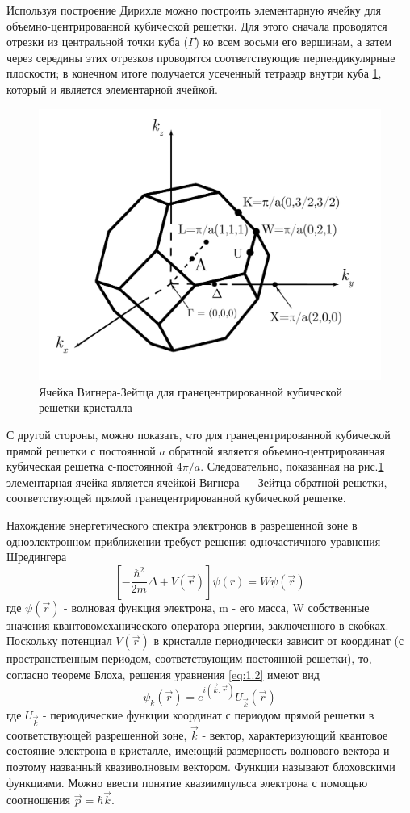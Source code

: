 		Используя построение Дирихле можно построить элементарную ячейку для объемно-центрированной кубической решетки. Для
		этого сначала проводятся отрезки из центральной точки куба ($\Gamma$) ко всем восьми его вершинам, а затем через середины этих
		отрезков проводятся соответствующие перпендикулярные плоскости; в конечном итоге получается усеченный тетраэдр внутри
		куба \ref{fig:1.4}, который и является элементарной ячейкой.
		\begin{figure}[h!]
			\centering
			\includegraphics[width = .8\linewidth]{img/14}
			\caption{Ячейка Вигнера-Зейтца для гранецентрированной кубической решетки кристалла}
			\label{fig:1.4}
		\end{figure}
		С другой стороны, можно показать, что для гранецентрированной кубической прямой решетки с постоянной $a$ обратной является
		объемно-центрированная кубическая решетка с-постоянной $4 \pi /a$. Следовательно, показанная на рис.\ref{fig:1.4} элементарная ячейка
		является ячейкой Вигнера — Зейтца обратной решетки, соответствующей прямой гранецентрированной кубической решетке.
		
		Нахождение энергетического спектра электронов в разрешенной зоне в одноэлектронном приближении требует решения одночастичного уравнения Шредингера
		\begin{equation}
		\left[-\frac{\hbar^{2}}{2 m} \Delta+V(\vec{r})\right] \psi(r)=W \psi(\vec{r})
		\label{eq:1.4}
		\end{equation}
		где $\psi(\vec{r})$ - волновая функция электрона, m - его масса, W собственные значения квантовомеханического оператора
		энергии, заключенного в скобках. Поскольку потенциал $V(\vec{r})$ в кристалле периодически зависит от координат (с
		пространственным периодом, соответствующим постоянной решетки), то, согласно теореме Блоха, решения уравнения
		\eqref{eq:1.2} имеют вид
		\begin{equation}
		\psi_{k}(\vec{r})=e^{i(\vec{k}, \vec{r})} U_{\vec{k}}(\vec{r})
		\label{eq:1.5}
		\end{equation}
		где $ U_{\vec{k}}$ - периодические функции координат с периодом прямой решетки в соответствующей разрешенной зоне,
		$\vec{k}$ - вектор, характеризующий квантовое состояние электрона в кристалле, имеющий размерность волнового вектора и
		поэтому названный квазиволновым вектором. Функции называют блоховскими функциями. Можно ввести понятие квазиимпульса
		электрона с помощью соотношения $\vec{p}=\hbar \vec{k}$.
		
